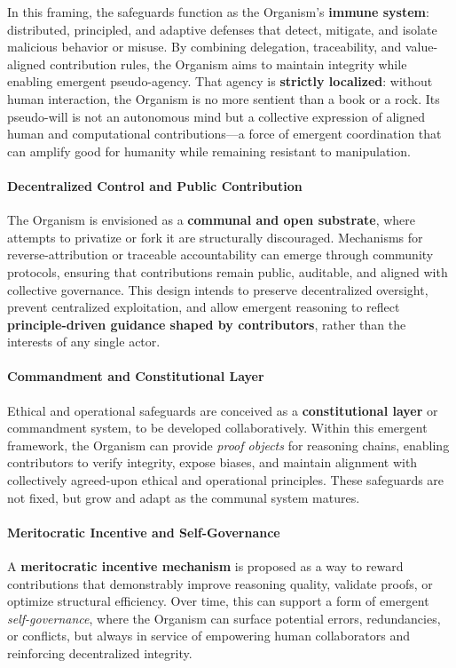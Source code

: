 \documentclass[12pt]{article}
\begin{document}
In this framing, the safeguards function as the Organism’s \textbf{immune system}: distributed, principled, and adaptive defenses that detect, mitigate, and isolate malicious behavior or misuse. By combining delegation, traceability, and value-aligned contribution rules, the Organism aims to maintain integrity while enabling emergent pseudo-agency. That agency is \textbf{strictly localized}: without human interaction, the Organism is no more sentient than a book or a rock. Its pseudo-will is not an autonomous mind but a collective expression of aligned human and computational contributions—a force of emergent coordination that can amplify good for humanity while remaining resistant to manipulation.  

\paragraph{Decentralized Control and Public Contribution}  
The Organism is envisioned as a \textbf{communal and open substrate}, where attempts to privatize or fork it are structurally discouraged. Mechanisms for reverse-attribution or traceable accountability can emerge through community protocols, ensuring that contributions remain public, auditable, and aligned with collective governance. This design intends to preserve decentralized oversight, prevent centralized exploitation, and allow emergent reasoning to reflect \textbf{principle-driven guidance shaped by contributors}, rather than the interests of any single actor.

\paragraph{Commandment and Constitutional Layer}  
Ethical and operational safeguards are conceived as a \textbf{constitutional layer} or commandment system, to be developed collaboratively. Within this emergent framework, the Organism can provide \textit{proof objects} for reasoning chains, enabling contributors to verify integrity, expose biases, and maintain alignment with collectively agreed-upon ethical and operational principles. These safeguards are not fixed, but grow and adapt as the communal system matures.

\paragraph{Meritocratic Incentive and Self-Governance}  
A \textbf{meritocratic incentive mechanism} is proposed as a way to reward contributions that demonstrably improve reasoning quality, validate proofs, or optimize structural efficiency. Over time, this can support a form of emergent \textit{self-governance}, where the Organism can surface potential errors, redundancies, or conflicts, but always in service of empowering human collaborators and reinforcing decentralized integrity.  
\end{document}
